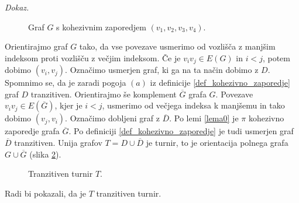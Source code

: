 \documentclass[a4paper, 12pt]{book}
\newenvironment{dokaz}{\emph{Dokaz.}\ }{\hspace{\fill}{$\Box$}}
\begin{document}
\begin{dokaz}
\begin{figure}[h]
\begin{center}
        \end{center}
        \caption{Graf $G$ s kohezivnim zaporedjem $(v_1, v_2, v_3, v_4)$.}
        \label{graf_s_kohezivnim_zaporedjem}
    \end{figure}
    Orientirajmo graf $G$ tako, da vse povezave usmerimo od vozlišča z manjšim indeksom proti vozlišču z večjim indeksom. Če je $v_iv_j \in E(G)$ in $i < j$, potem dobimo $(v_i, v_j)$. Označimo usmerjen graf, ki ga na ta način dobimo z $D$. Spomnimo se, da je zaradi pogoja $(a)$ iz definicije \ref{def_kohezivno_zaporedje} graf $D$ tranzitiven. Orientirajmo še komplement $\overline{G}$ grafa $G$. Povezave $v_iv_j \in E(\overline{G})$, kjer je $i < j$, usmerimo od večjega indeksa k manjšemu in tako dobimo $(v_j, v_i)$. Označimo dobljeni graf z $\overline{D}$. Po lemi \ref{lema0} je $\pi$ kohezivno zaporedje grafa $\overline{G}$. Po definiciji \ref{def_kohezivno_zaporedje} je tudi usmerjen graf $\overline{D}$ tranzitiven. Unija grafov $T = D \cup \overline{D}$ je turnir, to je orientacija polnega grafa $G \cup \overline{G}$ (slika \ref{graf_tranzitivni_turnir}).
    \begin{figure}[h]
        \begin{center}
        \end{center}
        \caption{ Tranzitiven turnir $T$.}
        \label{graf_tranzitivni_turnir}
    \end{figure}
    Radi bi pokazali, da je $T$ tranzitiven turnir. 
    

\end{dokaz}
\end{document}
